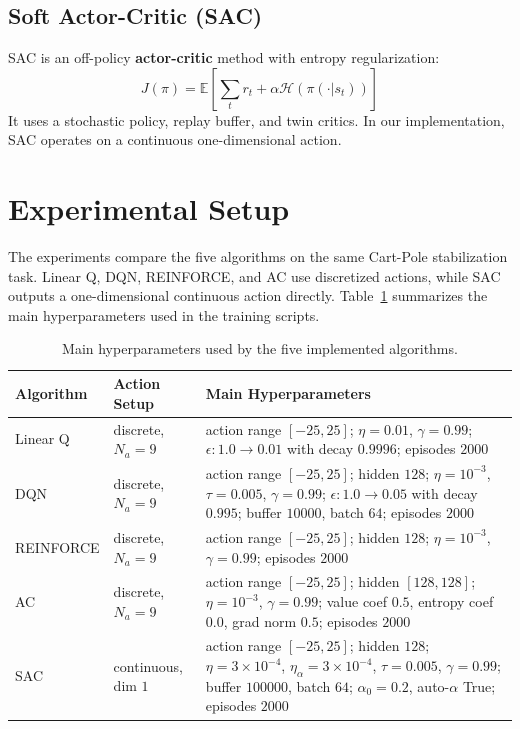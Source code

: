 \documentclass[11pt]{article} %
\begin{document}
\subsection{Soft Actor-Critic (SAC)}
SAC is an off-policy \textbf{actor-critic} method with entropy regularization:
\[ J(\pi) = \mathbb{E}\left[\sum_t r_t + \alpha \mathcal{H}(\pi(\cdot|s_t))\right] \]
It uses a stochastic policy, replay buffer, and twin critics. In our implementation, SAC operates on a continuous one-dimensional action.

\section{Experimental Setup}
The experiments compare the five algorithms on the same Cart-Pole stabilization task. Linear Q, DQN, REINFORCE, and AC use discretized actions, while SAC outputs a one-dimensional continuous action directly. Table~\ref{tab:hyperparams} summarizes the main hyperparameters used in the training scripts.

\begin{table}[H]
\centering
\scriptsize
\setlength{\tabcolsep}{4pt}
\renewcommand{\arraystretch}{1.1}
\begin{tabularx}{\textwidth}{|>{\raggedright\arraybackslash}p{}|>{\raggedright\arraybackslash}p{}|>{\raggedright\arraybackslash}X|}
\hline
\textbf{Algorithm} & \textbf{Action Setup} & \textbf{Main Hyperparameters} \\
\hline
Linear Q & discrete, $N_a=9$ & action range $[-25,25]$; $\eta=0.01$, $\gamma=0.99$; $\epsilon: 1.0 \rightarrow 0.01$ with decay $0.9996$; episodes $2000$ \\
\hline
DQN & discrete, $N_a=9$ & action range $[-25,25]$; hidden $128$; $\eta=10^{-3}$, $\tau=0.005$, $\gamma=0.99$; $\epsilon: 1.0 \rightarrow 0.05$ with decay $0.995$; buffer $10000$, batch $64$; episodes $2000$ \\
\hline
REINFORCE & discrete, $N_a=9$ & action range $[-25,25]$; hidden $128$; $\eta=10^{-3}$, $\gamma=0.99$; episodes $2000$ \\
\hline
AC & discrete, $N_a=9$ & action range $[-25,25]$; hidden $[128,128]$; $\eta=10^{-3}$, $\gamma=0.99$; value coef $0.5$, entropy coef $0.0$, grad norm $0.5$; episodes $2000$ \\
\hline
SAC & continuous, dim $1$ & action range $[-25,25]$; hidden $128$; $\eta=3\times10^{-4}$, $\eta_\alpha=3\times10^{-4}$, $\tau=0.005$, $\gamma=0.99$; buffer $100000$, batch $64$; $\alpha_0=0.2$, auto-$\alpha$ True; episodes $2000$ \\
\hline
\end{tabularx}
\caption{Main hyperparameters used by the five implemented algorithms.}
\label{tab:hyperparams}
\end{table}
\end{document}
